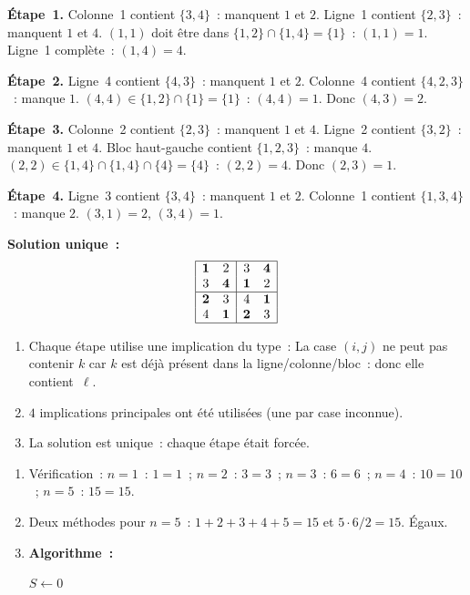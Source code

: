 \textbf{\'Etape~1.} Colonne~1 contient $\{3,4\}$~: manquent $1$ et $2$.
Ligne~1 contient $\{2,3\}$~: manquent $1$ et $4$.
$(1,1)$ doit \^etre dans $\{1,2\}\cap\{1,4\}=\{1\}$~: \textbf{$(1,1)=1$}.
Ligne~1 compl\`ete~: $(1,4)=4$.

\textbf{\'Etape~2.} Ligne~4 contient $\{4,3\}$~: manquent $1$ et $2$.
Colonne~4 contient $\{4,2,3\}$~: manque $1$.
$(4,4)\in\{1,2\}\cap\{1\}=\{1\}$~: \textbf{$(4,4)=1$}. Donc $(4,3)=2$.

\textbf{\'Etape~3.} Colonne~2 contient $\{2,3\}$~: manquent $1$ et $4$.
Ligne~2 contient $\{3,2\}$~: manquent $1$ et $4$.
Bloc haut-gauche contient $\{1,2,3\}$~: manque $4$.
$(2,2)\in\{1,4\}\cap\{1,4\}\cap\{4\}=\{4\}$~: \textbf{$(2,2)=4$}. Donc $(2,3)=1$.

\textbf{\'Etape~4.} Ligne~3 contient $\{3,4\}$~: manquent $1$ et $2$.
Colonne~1 contient $\{1,3,4\}$~: manque $2$.
$(3,1)=2$, $(3,4)=1$.

\textbf{Solution unique~:}
\[
\begin{array}{|cc|cc|}
\hline
\mathbf{1} & 2 & 3 & \mathbf{4} \\
3 & \mathbf{4} & \mathbf{1} & 2 \\
\hline
\mathbf{2} & 3 & 4 & \mathbf{1} \\
4 & \mathbf{1} & \mathbf{2} & 3 \\
\hline
\end{array}
\]

\begin{enumerate}
  \item Chaque \'etape utilise une implication du type~:
        \og La case $(i,j)$ ne peut pas contenir $k$ car $k$ est
        d\'ej\`a pr\'esent dans la ligne/colonne/bloc~: donc elle contient~$\ell$.\fg
  \item $4$ implications principales ont \'et\'e utilis\'ees (une par case inconnue).
  \item La solution est unique~: chaque \'etape \'etait forc\'ee.
\end{enumerate}


\begin{enumerate}
  \item V\'erification~: $n=1$~: $1=1$\checkmark~; $n=2$~: $3=3$\checkmark~;
        $n=3$~: $6=6$\checkmark~; $n=4$~: $10=10$\checkmark~; $n=5$~: $15=15$\checkmark.
  \item Deux m\'ethodes pour $n=5$~: $1+2+3+4+5=15$ et $5\cdot6/2=15$. \'Egaux.\checkmark
  \item \textbf{Algorithme~:}
\begin{algorithm}[H]
\caption{V\'erification de la formule de Gauss}
$S \leftarrow 0$\;
\end{algorithm}
\end{enumerate}


